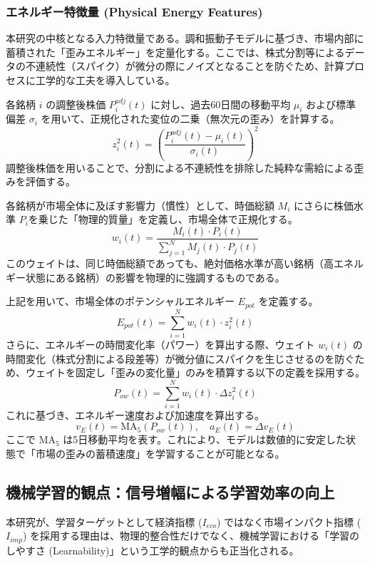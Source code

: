 \documentclass[11pt,a4paper,oneside]{ltjsarticle}
\begin{document}
\subsubsection{エネルギー特徴量 (Physical Energy Features)}
本研究の中核となる入力特徴量である。調和振動子モデルに基づき、市場内部に蓄積された「歪みエネルギー」を定量化する。ここでは、株式分割等によるデータの不連続性（スパイク）が微分の際にノイズとなることを防ぐため、計算プロセスに工学的な工夫を導入している。

各銘柄 $i$ の調整後株価 $P^{adj}_{i}(t)$ に対し、過去60日間の移動平均 $\mu_{i}$ および標準偏差 $\sigma_{i}$ を用いて、正規化された変位の二乗（無次元の歪み）を計算する。
\begin{equation}
    z_{i}^{2}(t) = \left( \frac{P^{adj}_{i}(t) - \mu_{i}(t)}{\sigma_{i}(t)} \right)^{2}
\end{equation}
調整後株価を用いることで、分割による不連続性を排除した純粋な需給による歪みを評価する。

各銘柄が市場全体に及ぼす影響力（慣性）として、時価総額 $M_{i}$ にさらに株価水準 $P_{i}$を乗じた「物理的質量」を定義し、市場全体で正規化する。
\begin{equation}
    w_{i}(t) = \frac{M_{i}(t) \cdot P_{i}(t)}{\sum_{j=1}^{N} M_{j}(t) \cdot P_{j}(t)}
\end{equation}
このウェイトは、同じ時価総額であっても、絶対価格水準が高い銘柄（高エネルギー状態にある銘柄）の影響を物理的に強調するものである。

上記を用いて、市場全体のポテンシャルエネルギー $E_{pot}$ を定義する。
\begin{equation}
    E_{pot}(t) = \sum_{i=1}^{N} w_{i}(t) \cdot z_{i}^{2}(t)
\end{equation}
さらに、エネルギーの時間変化率（パワー）を算出する際、ウェイト $w_{i}(t)$ の時間変化（株式分割による段差等）が微分値にスパイクを生じさせるのを防ぐため、ウェイトを固定し「歪みの変化量」のみを積算する以下の定義を採用する。
\begin{equation}
    P_{ow}(t) = \sum_{i=1}^{N} w_{i}(t) \cdot \Delta z_{i}^{2}(t)
\end{equation}
これに基づき、エネルギー速度および加速度を算出する。
\begin{equation}
    v_{E}(t) = \text{MA}_{5}(P_{ow}(t)), \quad a_{E}(t) = \Delta v_{E}(t)
\end{equation}
ここで $\text{MA}_{5}$ は5日移動平均を表す。これにより、モデルは数値的に安定した状態で「市場の歪みの蓄積速度」を学習することが可能となる。


\subsection{機械学習的観点：信号増幅による学習効率の向上}
本研究が、学習ターゲットとして経済指標 ($I_{eco}$) ではなく市場インパクト指標 ($I_{imp}$) を採用する理由は、物理的整合性だけでなく、機械学習における「学習のしやすさ (Learnability)」という工学的観点からも正当化される。
\end{document}
